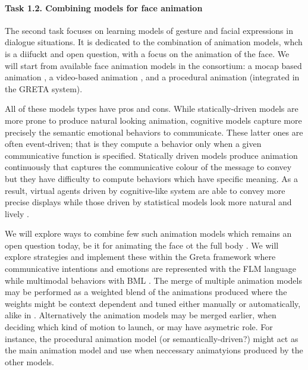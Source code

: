\paragraph{Task 1.2. Combining models for face animation } 

The second task focuses on learning models of gesture and facial expressions in dialogue situations. It is dedicated to the combination of animation models, whch is a diifuckt and open question, with a focus on the animation of the face. We will start from available face animation models in the consortium: a mocap based animation \cite{Ding2013}, a video-based animation \cite{TheseINRIA}, and a procedural animation \cite{Greta} (integrated in the GRETA system). 

All of these models types have pros and cons. While statically-driven models are more prone to produce natural looking animation, cognitive
models capture more precisely the semantic emotional behaviors to communicate. These latter ones are often event-driven; that is they compute a behavior only when a given communicative function is specified. Statically driven models produce animation continuously that captures the communicative colour of the message to convey but they have difficulty to compute behaviors which have specific meaning. As a result, virtual agents driven by cognitive-like system are able to convey more precise displays while those driven by statistical models look more natural and lively \cite{DBLP:conf/iva/LeeM12}.

We will explore ways to combine few such animation models which remains an open question today, be it for animating the face ot the full body \cite{...}. We will explore strategies and implement these within the Greta framework where communicative intentions and emotions are represented with the FLM language while multimodal behaviors with BML \cite{DBLP:conf/iva/VilhjalmssonCCCKKMMMPRTWW07}. The merge of multiple animation models may be performed as a weighted blend of the animations produced where the weights might be context dependent and tuned either manually or automatically, alike in \cite{DBLP:journals/tvcg/ShoulsonMKB14}. Alternatively the animation models may be merged earlier, when deciding which kind of motion to launch, or may have asymetric role. For instance, the procedural animation model (or semantically-driven?) might act as the main animation model and use when neccessary animatyions produced by the other models.




% 
% 

